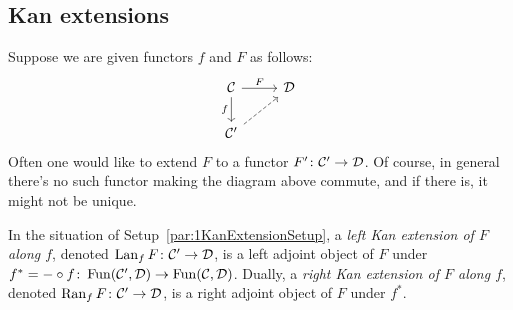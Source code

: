 \subsection{Kan extensions}
\begin{numpar}[Setup]\label{par:1KanExtensionSetup}
	Suppose we are given functors $f$ and $F$ as follows:
	\begin{equation*}
		\begin{tikzcd}
			\Cc\rar["F"]\dar["f"'] & \Dd\\
			\Cc'\urar[dashed] &
		\end{tikzcd}
	\end{equation*}
	Often one would like to extend $F$ to a functor $F'\colon \mathcal{C}'\rightarrow\mathcal{D}$. Of course, in general there's no such functor making the diagram above commute, and if there is, it might not be unique.
\end{numpar}
\begin{defi}\label{def:1KanExtensions}
	In the situation of Setup~\cref{par:1KanExtensionSetup}, a \emph{left Kan extension of $F$ along $f$}, denoted $\operatorname{Lan}_fF\colon \mathcal{C}'\rightarrow \mathcal{D}$, is a left adjoint object of $F$ under $f^*=-\circ f\colon \operatorname{Fun}(\mathcal{C}',\mathcal{D})\rightarrow \operatorname{Fun}(\mathcal{C},\mathcal{D})$. Dually, a \emph{right Kan extension of $F$ along $f$}, denoted $\operatorname{Ran}_fF\colon \mathcal{C}'\rightarrow\mathcal{D}$, is a right adjoint object of $F$ under $f^*$.
\end{defi}
